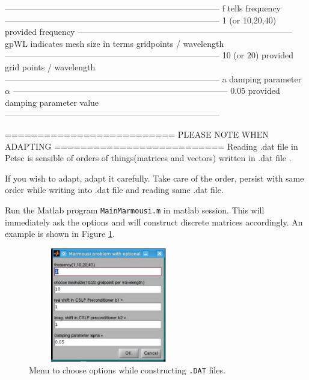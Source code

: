 \documentclass[a4paper,11pt]{article}
\begin{document}
-----------------------------------------------------------------------------
f			tells frequency
-----------------------------------------------------------------------------
1 (or 10,20,40)	 	provided frequency
-----------------------------------------------------------------------------
gpWL			indicates mesh size in terms gridpoints / wavelength
-----------------------------------------------------------------------------
10 (or 20)		provided grid points / wavelength
-----------------------------------------------------------------------------
a			damping parameter $\alpha$
-----------------------------------------------------------------------------
0.05			provided damping parameter value
-----------------------------------------------------------------------------




==========================
PLEASE NOTE WHEN ADAPTING
==========================
Reading .dat file in Petsc is sensible of orders of things(matrices and
vectors) 
written in .dat file . 

If you wish to adapt, adapt it carefully. Take care of the order, 
persist with same order while writing into .dat file and reading same .dat file.


Run the Matlab program \texttt{MainMarmousi.m} in matlab session. This will
immediately ask the options and will construct discrete matrices accordingly.
An example is shown in Figure \ref{fig:fig1}.
%
\begin{figure}[h]
\centering
\includegraphics[width=7cm,height=5cm]{image1.pdf}
\caption{Menu to choose options while constructing \texttt{.DAT} files.}
\label{fig:fig1}
\end{figure}
\\



% 
% 
% 
% 
% 
% 
% 
% 
% 
% 
%  
%   
%    

%
\end{document}
